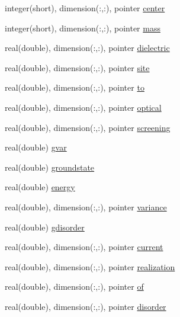 \begin{DoxyCompactItemize}
\item 
integer(short), dimension(\+:,\+:), pointer \hyperlink{structdipoles__class_1_1dipoles_a959e48d8726c84ad96695f27f5a324df}{center}
\item 
integer(short), dimension(\+:,\+:), pointer \hyperlink{structdipoles__class_1_1dipoles_a30387a2e38cdc8fac3440fb019fa39e4}{mass}
\item 
real(double), dimension(\+:,\+:), pointer \hyperlink{structdipoles__class_1_1dipoles_a669f75c4c95efa1ea721ba8aa7f785d3}{dielectric}
\item 
real(double), dimension(\+:,\+:), pointer \hyperlink{structdipoles__class_1_1dipoles_a195b04ed4976581c965eb24b155dee4b}{site}
\item 
real(double), dimension(\+:,\+:), pointer \hyperlink{structdipoles__class_1_1dipoles_aa236248648a049967f193ec7a2e721a3}{to}
\item 
real(double), dimension(\+:,\+:), pointer \hyperlink{structdipoles__class_1_1dipoles_a7a0b0cffbbb4e48c4bced86e3684ac14}{optical}
\item 
real(double), dimension(\+:,\+:), pointer \hyperlink{structdipoles__class_1_1dipoles_a353f22dda5068231a14e388b11f2c5cc}{screening}
\item 
real(double) \hyperlink{structdipoles__class_1_1dipoles_a6723a79a10a1b02fe363c2fdf8d0b1aa}{gvar}
\item 
real(double) \hyperlink{structdipoles__class_1_1dipoles_a0ad3fc4bf8e3d48aea2e39d709e5f4ca}{groundstate}
\item 
real(double) \hyperlink{structdipoles__class_1_1dipoles_ac0229d4af6218531a78c4890b752a1e7}{energy}
\item 
real(double), dimension(\+:,\+:), pointer \hyperlink{structdipoles__class_1_1dipoles_afd272228e55cd38a7215e18d5e4008c0}{variance}
\item 
real(double) \hyperlink{structdipoles__class_1_1dipoles_a56a67d756e3344283660da0e91aefa93}{gdisorder}
\item 
real(double), dimension(\+:,\+:), pointer \hyperlink{structdipoles__class_1_1dipoles_a1f7d8ab8bd71a85a74e56b5461023742}{current}
\item 
real(double), dimension(\+:,\+:), pointer \hyperlink{structdipoles__class_1_1dipoles_a9f2ebcd22fb84b6121f41bb4b8935273}{realization}
\item 
real(double), dimension(\+:,\+:), pointer \hyperlink{structdipoles__class_1_1dipoles_ab0c3afd0f8e4b8c3a1ee521a7b96aefb}{of}
\item 
real(double), dimension(\+:,\+:), pointer \hyperlink{structdipoles__class_1_1dipoles_aa815bc50fc42d986bbb65c421adad3e1}{disorder}

\end{DoxyCompactItemize}
